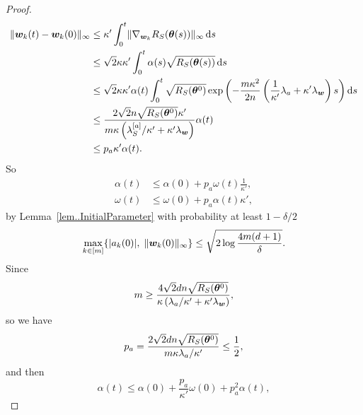 \documentclass{article}
\begin{document}
\begin{proof}
    \begin{equation}
        \begin{aligned}
            \lVert\bm{w}_k(t) - \bm{w}_k(0)\rVert_{\infty}
             & \leq \kappa'\int_{0}^{t} \lVert\nabla_{\bm{w}_k}R_S(\bm{\theta}(s))\rVert_{\infty}\mathop{}\!\mathrm{d}{s}                                                                                                  \\
             & \leq \sqrt{2}\kappa\kappa' \int_{0}^t \alpha(s)\sqrt{R_S(\bm{\theta}(s))} \mathop{}\!\mathrm{d}{s}                                                                                                        \\
             & \leq \sqrt{2}\kappa\kappa' \alpha(t) \int_{0}^{t} \sqrt{R_S(\bm{\theta}^0)}\exp\left(-\frac{m\kappa^2}{2n}\left(\frac{1}{\kappa'}\lambda_a+\kappa'\lambda_{\bm{w}}\right)s\right)\mathop{}\!\mathrm{d}{s} \\
             & \leq \frac{2\sqrt{2}n\sqrt{R_S(\bm{\theta}^0)}\kappa'}{m\kappa\left(\lambda^{[a]}_S/\kappa'+\kappa'\lambda_{\bm{w}}\right)}\alpha(t)                                                   \\
             & \leq p_a\kappa'\alpha(t).
        \end{aligned}
    \end{equation}
    So
    \begin{equation}
        \begin{aligned}
            \alpha(t) & \leq\alpha(0)+p_a\omega(t)\frac{1}{\kappa'}, \\
            \omega(t) & \leq\omega(0)+p_a\alpha(t)\kappa',
        \end{aligned}
    \end{equation}
    by Lemma~\ref{lem..InitialParameter} with probability at least $1 - \delta/2$
    \begin{equation}
        \max\limits_{k\in[m]}\{\lvert a_k(0)\rvert,\;\lVert\bm{w}_k(0)\rVert_{\infty}\}\leq\sqrt{2\log\frac{4m(d+1)}{\delta}}.
    \end{equation}
    Since
    \begin{equation}
        m \geq \frac{4\sqrt{2}dn\sqrt{R_S(\bm{\theta}^0)}}{\kappa\left(\lambda_a/\kappa'+\kappa'\lambda_{\bm{w}}\right)},
    \end{equation}
    so we have
    \begin{equation}
        p_a=\frac{2\sqrt{2}dn\sqrt{R_S(\bm{\theta}^0)}}{m\kappa\lambda_a/\kappa'}\leq \frac{1}{2},
    \end{equation}
    and then
    \begin{equation}
        \alpha(t)\leq\alpha(0)+\frac{p_a}{\kappa'}\omega(0)+p_a^2\alpha(t),

\end{equation}
\end{proof}
\end{document}
